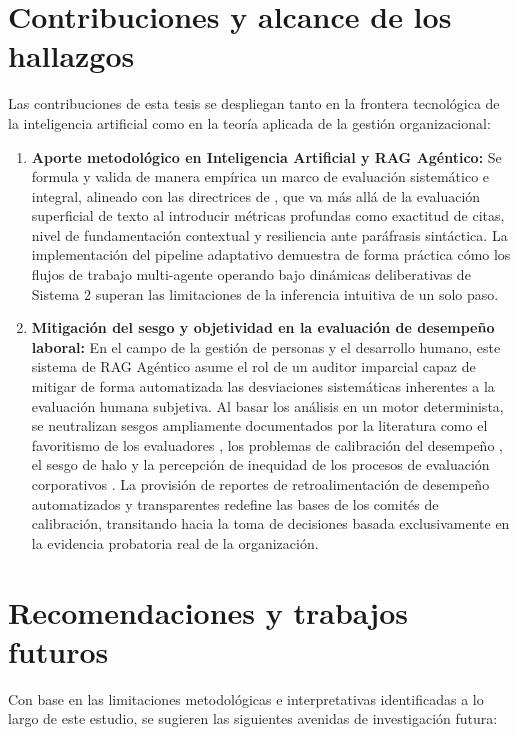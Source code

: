\section{Contribuciones y alcance de los hallazgos}
\label{sec:contribuciones_alcance}
Las contribuciones de esta tesis se despliegan tanto en la frontera tecnológica de la inteligencia artificial como en la teoría aplicada de la gestión organizacional:

\begin{enumerate}
    \item \textbf{Aporte metodológico en Inteligencia Artificial y RAG Agéntico:} Se formula y valida de manera empírica un marco de evaluación sistemático e integral, alineado con las directrices de \cite{saadfalcon2024ares, ragas2024}, que va más allá de la evaluación superficial de texto al introducir métricas profundas como exactitud de citas, nivel de fundamentación contextual y resiliencia ante paráfrasis sintáctica. La implementación del pipeline adaptativo demuestra de forma práctica cómo los flujos de trabajo multi-agente \cite{autogen2024, langgraph2026} operando bajo dinámicas deliberativas de Sistema 2 \cite{liang2025reasoning} superan las limitaciones de la inferencia intuitiva de un solo paso.

    \item \textbf{Mitigación del sesgo y objetividad en la evaluación de desempeño laboral:} En el campo de la gestión de personas y el desarrollo humano, este sistema de RAG Agéntico asume el rol de un auditor imparcial capaz de mitigar de forma automatizada las desviaciones sistemáticas inherentes a la evaluación humana subjetiva. Al basar los análisis en un motor determinista, se neutralizan sesgos ampliamente documentados por la literatura como el favoritismo de los evaluadores \cite{bauch2025accountability}, los problemas de calibración del desempeño \cite{bol2025calibration}, el sesgo de halo \cite{kim2025halos} y la percepción de inequidad de los procesos de evaluación corporativos \cite{tarigan2025appraisals, muhammada2025appraisalfairness}. La provisión de reportes de retroalimentación de desempeño automatizados y transparentes \cite{heine2025feedback} redefine las bases de los comités de calibración, transitando hacia la toma de decisiones basada exclusivamente en la evidencia probatoria real de la organización.
\end{enumerate}

\section{Recomendaciones y trabajos futuros}
\label{sec:recomendaciones_futuro}
Con base en las limitaciones metodológicas e interpretativas identificadas a lo largo de este estudio, se sugieren las siguientes avenidas de investigación futura:

